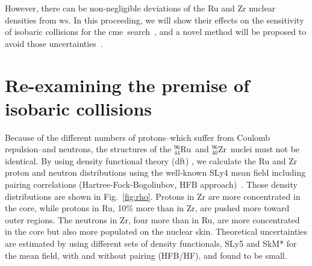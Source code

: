 \documentclass[3p,times,procedia]{elsarticle}
\newcommand {\dft}	{{\sc dft}}
\newcommand {\ws}	{{\sc ws}}
\newcommand {\cme}	{{\mbox{\sc cme}}}
\newcommand {\etwo}	{\epsilon_2}
\newcommand {\Ru}	{$^{96}_{44}$Ru}
\newcommand {\Zr}	{$^{96}_{40}$Zr}
\newcommand {\RuRu}	{RuRu}
\newcommand {\ZrZr}	{ZrZr}
\newcommand {\Bbf}	{\mathbf{B}}
\begin{document}
However, there can be non-negligible deviations of the Ru and Zr nuclear densities from \ws. In this proceeding, we will show their effects on the sensitivity of isobaric collisions for the \cme\ search~\cite{Xu:2017zcn}, and a novel method will be proposed to avoid those uncertainties~\cite{Xu:2017qfs}.  

\section{Re-examining the premise of isobaric collisions}
Because of the different numbers of protons--which suffer from Coulomb repulsion--and neutrons, the structures of the \Ru\ and \Zr\ nuclei must not be identical.
By using density functional theory (\dft) , we calculate the Ru and Zr proton and neutron distributions using the well-known SLy4 mean field including pairing correlations (Hartree-Fock-Bogoliubov, HFB approach)~\cite{Wang:2016rqh}.
Those density distributions are shown in Fig.~\ref{fig:rho}.
Protons in Zr are more concentrated in the core, while protons in Ru, 10\% more than in Zr, are pushed more toward outer regions. The neutrons in Zr, four more than in Ru, are more concentrated in the core but also more populated on the nuclear skin. Theoretical uncertainties are estimated by using different sets of density functionals, SLy5 and SkM* for the mean field, with and without pairing (HFB/HF), and found to be small. %
%
\end{document}
